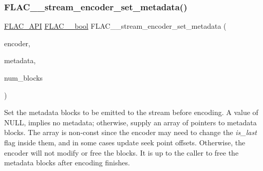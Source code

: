 \subsubsection{\texorpdfstring{F\+L\+A\+C\+\_\+\+\_\+stream\+\_\+encoder\+\_\+set\+\_\+metadata()}{FLAC\_\_stream\_encoder\_set\_metadata()}}
{\footnotesize\ttfamily \hyperlink{group__flac__export_ga56ca07df8a23310707732b1c0007d6f5}{F\+L\+A\+C\+\_\+\+A\+PI} \hyperlink{ordinals_8h_a95103469f1cbd78b8cf250194985b34e}{F\+L\+A\+C\+\_\+\+\_\+bool} F\+L\+A\+C\+\_\+\+\_\+stream\+\_\+encoder\+\_\+set\+\_\+metadata (\begin{DoxyParamCaption}\item[{\hyperlink{struct_f_l_a_c_____stream_encoder}{F\+L\+A\+C\+\_\+\+\_\+\+Stream\+Encoder} $\ast$}]{encoder,  }\item[{\hyperlink{struct_f_l_a_c_____stream_metadata}{F\+L\+A\+C\+\_\+\+\_\+\+Stream\+Metadata} $\ast$$\ast$}]{metadata,  }\item[{unsigned}]{num\+\_\+blocks }\end{DoxyParamCaption})}

Set the metadata blocks to be emitted to the stream before encoding. A value of {\ttfamily N\+U\+LL}, {} implies no metadata; otherwise, supply an array of pointers to metadata blocks. The array is non-\/const since the encoder may need to change the {\itshape is\+\_\+last} flag inside them, and in some cases update seek point offsets. Otherwise, the encoder will not modify or free the blocks. It is up to the caller to free the metadata blocks after encoding finishes.

